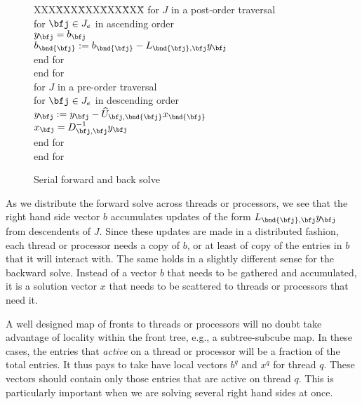 \begin{figure}
\caption{Serial forward and back solve}
\label{fig:serial-solve}
\begin{center}
\begin{minipage}{3.5 in}
\begin{tabbing}
XXX\=XXX\=XXX\=XXX\=XXX\=\kill
for $J$ in a post-order traversal \\
\> for $\bfj \in J_e$ in ascending order \\
\>\> $y_{\bfj} = b_{\bfj}$ \\
\>\> $b_{\bnd{\bfj}} :=
      b_{\bnd{\bfj}} - L_{\bnd{\bfj},\bfj} y_{\bfj}$ \\
\> end for\\
end for\\
for $J$ in a pre-order traversal \\
\> for $\bfj \in J_e$ in descending order \\
\>\> $y_{\bfj} := y_{\bfj} 
        - {\widehat U}_{\bfj,\bnd{\bfj}} x_{\bnd{\bfj}}$ \\
\>\> $x_{\bfj} = D_{\bfj,\bfj}^{-1} y_{\bfj}$ \\
\> end for\\
end for
\end{tabbing}
\end{minipage}
\end{center}
\end{figure}
\par
As we distribute the forward solve across threads or processors,
we see that the right hand side vector $b$ accumulates updates of
the form $L_{\bnd{\bfj},\bfj} y_{\bfj}$ from descendents of $J$.
Since these updates are made in a distributed fashion, each thread
or processor needs a copy of $b$, or at least of copy of the
entries in $b$ that it will interact with.
The same holds in a slightly different sense for the backward solve.
Instead of a vector $b$ that needs to be gathered and accumulated,
it is a solution vector $x$ that needs to be scattered to threads
or processors that need it.
\par
A well designed map of fronts to threads or processors will no
doubt take advantage of locality within the front tree, e.g.,
a subtree-subcube map.
In these cases, the entries that {\it active} on a thread or
processor will be a fraction of the total entries.
It thus pays to take have local vectors $b^q$ and $x^q$ for thread $q$.
These vectors should contain only those entries that are active
on thread $q$.
This is particularly important when we are solving several right
hand sides at once.
